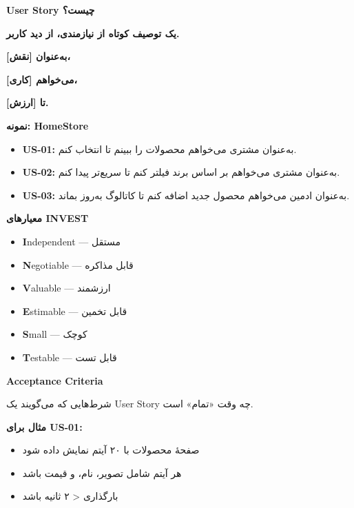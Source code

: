 \documentclass[14pt, a4paper, landscape]{extarticle}
\newcommand{\slide}[1]{%
    \newpage
    \begin{center}
    \begin{minipage}[t]{0.95\textwidth}
    \vspace{0.5cm}
    #1
    \vspace{0.5cm}
    \end{minipage}
    \end{center}
}
\newcommand{\slidetitle}[1]{%
    \begin{center}
        {\LARGE\bfseries\textcolor{primary}{#1}}
    \end{center}
    \vspace{0.5cm}
}
\newcommand{\myaccent}[1]{\textcolor{accent}{#1}}
\begin{document}
\slide{
    \slidetitle{User Story چیست؟}
    \vspace{1cm}
    \begin{center}
        {\Large\bfseries یک توصیف کوتاه از نیازمندی، از دید کاربر.}
        
        \vspace{2cm}
        
        {\large\bfseries\myaccent{به‌عنوان [نقش]،}}
        
        {\large\bfseries\myaccent{می‌خواهم [کاری]،}}
        
        {\large\bfseries\myaccent{تا [ارزش].}}
    \end{center}
}

\slide{
    \slidetitle{نمونه: HomeStore}
    \vspace{0.5cm}
    \begin{itemize}[itemsep=0.8em]
        \item {\large\textbf{US-01:} به‌عنوان مشتری می‌خواهم محصولات را ببینم تا انتخاب کنم.}
        \vspace{0.3cm}
        \item {\large\textbf{US-02:} به‌عنوان مشتری می‌خواهم بر اساس برند فیلتر کنم تا سریع‌تر پیدا کنم.}
        \vspace{0.3cm}
        \item {\large\textbf{US-03:} به‌عنوان ادمین می‌خواهم محصول جدید اضافه کنم تا کاتالوگ به‌روز بماند.}
    \end{itemize}
}

\slide{
    \slidetitle{معیارهای INVEST}
    \vspace{0.5cm}
    \begin{itemize}[itemsep=0.6em]
        \item \textbf{I}ndependent — مستقل
        \item \textbf{N}egotiable — قابل مذاکره
        \item \textbf{V}aluable — ارزشمند
        \item \textbf{E}stimable — قابل تخمین
        \item \textbf{S}mall — کوچک
        \item \textbf{T}estable — قابل تست
    \end{itemize}
}

\slide{
    \slidetitle{Acceptance Criteria}
    \vspace{0.5cm}
    {\large شرط‌هایی که می‌گویند یک User Story چه وقت «تمام» است.}
    
    \vspace{1cm}
    
    {\bfseries\textcolor{primary}{مثال برای US-01:}}
    \vspace{0.3cm}
    \begin{itemize}[itemsep=0.3em]
        \item صفحهٔ محصولات با ۲۰ آیتم نمایش داده شود
        \item هر آیتم شامل تصویر، نام، و قیمت باشد
        \item بارگذاری < ۲ ثانیه باشد
    \end{itemize}
}
\end{document}
